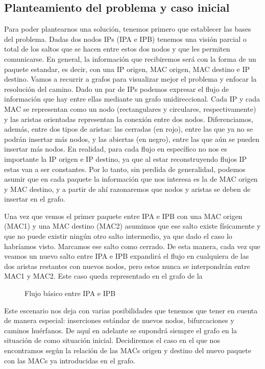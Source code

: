 \documentclass[twoside, 12pt]{epstfg}
\begin{document}
\subsection{Planteamiento del problema y caso inicial}
Para poder plantearnos una solución, tenemos primero que establecer las bases del problema. Dadas dos nodos IPs (IPA e IPB) tenemos una visión parcial o total de los saltos que se hacen entre estos dos nodos y que les permiten comunicarse. En general, la información que recibiremos será con la forma de un paquete estandar, es decir, con una IP origen, MAC origen, MAC destino e IP destino. Vamos a recurrir a grafos para visualizar mejor el problema y enfocar la resolución del camino. Dado un par de IPs podemos expresar el flujo de información que hay entre ellas mediante un grafo unidireccional. Cada IP y cada MAC se representan como un nodo (rectangulares y circulares, respectivamente) y las aristas orientadas representan la conexión entre dos nodos. Diferenciamos, además, entre dos tipos de aristas: las cerradas (en rojo), entre las que ya no se podrán insertar más nodos, y las abiertas (en negro), entre las que aún se pueden insertar más nodos. En realidad, para cada flujo en específico no nos es importante la IP origen e IP destino, ya que al estar reconstruyendo flujos IP estas van a ser constantes. Por lo tanto, sin perdida de generalidad, podemos asumir que en cada paquete la información que nos interesa es la de MAC origen y MAC destino, y a partir de ahí razonaremos que nodos y aristas se deben de insertar en el grafo. 

Una vez que vemos el primer paquete entre IPA e IPB con una MAC origen (MAC1) y una MAC destino (MAC2) asumimos que ese salto existe físicamente y que no puede existir ningún otro salto intermedio, ya que dado el caso lo habríamos visto. Marcamos ese salto como cerrado. De esta manera, cada vez que veamos un nuevo salto entre IPA e IPB expandirá el flujo en cualquiera de las dos aristas restantes con nuevos nodos, pero estos nunca se interpondrán entre MAC1 y MAC2. Este caso queda representado en el grafo de la 

\begin{figure}
\centering

\caption[Flujo básico entre dos IPs]{Flujo básico entre IPA e IPB}
\label{fig:Analisis:BasicFlow}
\end{figure}

Este escenario nos deja con varias posibilidades que tenemos que tener en cuenta de manera especial: inserciones estándar de nuevos nodos, bifurcaciones y caminos huérfanos. De aquí en adelante se supondrá siempre el grafo en la situación de  como situación inicial. Decidiremos el caso en el que nos encontramos según la relación de las MACs origen y destino del nuevo paquete con las MACs ya introducidas en el grafo.
\end{document}
